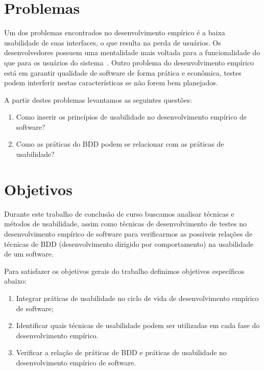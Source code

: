  

\section{Problemas}

Um dos problemas encontrados no desenvolvimento empírico é a baixa usabilidade de suas interfaces, o que resulta na perda de usuários. 
%
Os desenvolvedores possuem uma mentalidade mais voltada para a funcionalidade do que para os usuários do sistema~\cite{santos2012}. 
%
Outro problema do desenvolvimento empírico está em garantir qualidade de software de forma prática e econômica, testes podem interferir nestas características se não forem bem planejados.

A partir destes problemas levantamos as seguintes questões:
	
\begin{enumerate}
\item Como inserir os princípios de usabilidade no desenvolvimento empírico de software?
\item Como as práticas do BDD podem se relacionar com as práticas de usabilidade?
\end{enumerate}

\section{Objetivos}
	 
Durante este trabalho de conclusão de curso buscamos analisar técnicas e métodos de usabilidade, assim como técnicas de desenvolvimento de testes no desenvolvimento empírico de software para verificarmos as possíveis relações de técnicas de BDD (desenvolvimento dirigido por comportamento) na usabilidade de um software.

Para satisfazer os objetivos gerais do trabalho definimos objetivos específicos abaixo:

\begin{enumerate}
\item Integrar práticas de usabilidade no ciclo de vida de desenvolvimento empírico de software;
\item Identificar quais técnicas de usabilidade podem ser utilizadas em cada fase do desenvolvimento empírico.
\item Verificar a relação de práticas de BDD e práticas de usabilidade no desenvolvimento empírico de software.
\end{enumerate}

